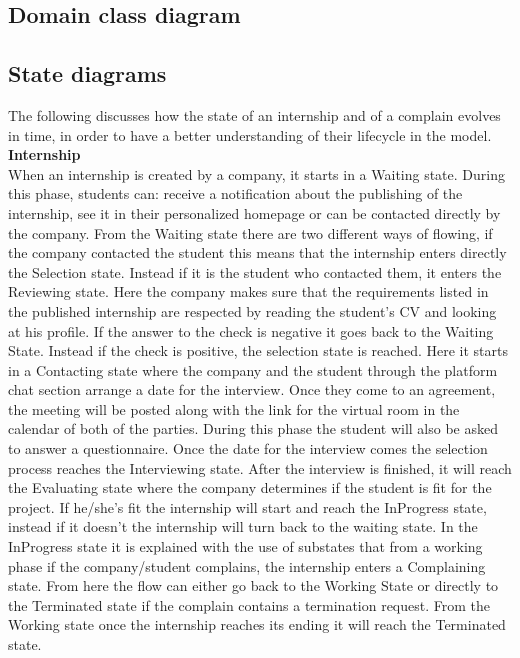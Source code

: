 \subsection{Domain class diagram}

\subsection{State diagrams}
The following discusses how the state of an internship and of a complain evolves in time, in order to have a better understanding of their lifecycle in the model.\\
\textbf{Internship}\\
When an internship is created by a company, it starts in a Waiting state. During this phase, students can: receive a notification about the publishing of the internship, see it in their personalized homepage or can be contacted directly by the company. From the Waiting state there are two different ways of flowing, if the company contacted the student this means that the internship enters directly the Selection state. Instead if it is the student who contacted them, it enters the Reviewing state. Here the company makes sure that the requirements listed in the published internship are respected by reading the student's CV and looking at his profile. If the answer to the check is negative it goes back to the Waiting State. Instead if the check is positive, the selection state is reached. Here it starts in a Contacting state where the company and the student through the platform chat section arrange a date for the interview. Once they come to an agreement, the meeting will be posted along with the link for the virtual room in the calendar of both of the parties. During this phase the student will also be asked to answer a questionnaire. Once the date for the interview comes the selection process reaches the Interviewing state. After the interview is finished, it will reach the Evaluating state where the company determines if the student is fit for the project. If he/she's fit the internship will start and reach the InProgress state, instead if it doesn't the internship will turn back to the waiting state. In the InProgress state it is explained with the use of substates that from a working phase if the company/student complains, the internship enters a Complaining state. From here the flow can either go back to the Working State or directly to the Terminated state if the complain contains a termination request. From the Working state once the internship reaches its ending it will reach the Terminated state.\\
